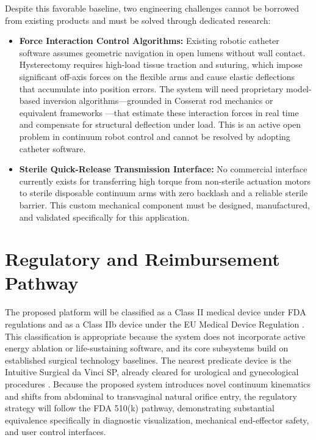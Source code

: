 \documentclass{article}
\begin{document}
Despite this favorable baseline, two engineering challenges cannot be borrowed from existing products and must be solved through dedicated research:

\begin{itemize}
    \item \textbf{Force Interaction Control Algorithms:} Existing robotic catheter software assumes geometric navigation in open lumens without wall contact. Hysterectomy requires high-load tissue traction and suturing, which impose significant off-axis forces on the flexible arms and cause elastic deflections that accumulate into position errors. The system will need proprietary model-based inversion algorithms---grounded in Cosserat rod mechanics or equivalent frameworks \cite{jalali2022dynamic}---that estimate these interaction forces in real time and compensate for structural deflection under load. This is an active open problem in continuum robot control and cannot be resolved by adopting catheter software.
    \item \textbf{Sterile Quick-Release Transmission Interface:} No commercial interface currently exists for transferring high torque from non-sterile actuation motors to sterile disposable continuum arms with zero backlash and a reliable sterile barrier. This custom mechanical component must be designed, manufactured, and validated specifically for this application.
\end{itemize}

\section{Regulatory and Reimbursement Pathway}

The proposed platform will be classified as a Class II medical device under FDA regulations and as a Class IIb device under the EU Medical Device Regulation \cite{simon2023european}. This classification is appropriate because the system does not incorporate active energy ablation or life-sustaining software, and its core subsystems build on established surgical technology baselines. The nearest predicate device is the Intuitive Surgical da Vinci SP, already cleared for urological and gynecological procedures \cite{fda2018davincisp}. Because the proposed system introduces novel continuum kinematics and shifts from abdominal to transvaginal natural orifice entry, the regulatory strategy will follow the FDA 510(k) pathway, demonstrating substantial equivalence specifically in diagnostic visualization, mechanical end-effector safety, and user control interfaces.
\end{document}
